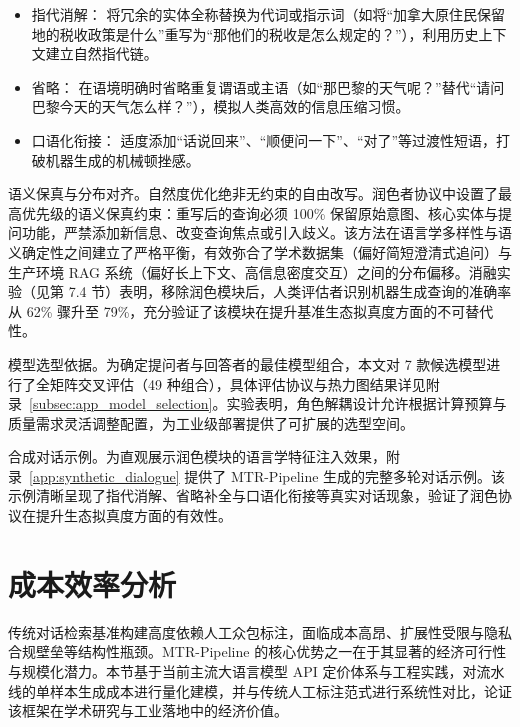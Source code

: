 \begin{itemize}

    \item 指代消解： 将冗余的实体全称替换为代词或指示词（如将“加拿大原住民保留地的税收政策是什么”重写为“那他们的税收是怎么规定的？”），利用历史上下文建立自然指代链。

    \item 省略： 在语境明确时省略重复谓语或主语（如“那巴黎的天气呢？”替代“请问巴黎今天的天气怎么样？”），模拟人类高效的信息压缩习惯。

    \item 口语化衔接： 适度添加“话说回来”、“顺便问一下”、“对了”等过渡性短语，打破机器生成的机械顿挫感。

\end{itemize}



语义保真与分布对齐。自然度优化绝非无约束的自由改写。润色者协议中设置了最高优先级的语义保真约束：重写后的查询必须 100\% 保留原始意图、核心实体与提问功能，严禁添加新信息、改变查询焦点或引入歧义。该方法在语言学多样性与语义确定性之间建立了严格平衡，有效弥合了学术数据集（偏好简短澄清式追问）与生产环境 RAG 系统（偏好长上下文、高信息密度交互）之间的分布偏移。消融实验（见第 7.4 节）表明，移除润色模块后，人类评估者识别机器生成查询的准确率从 62\% 骤升至 79\%，充分验证了该模块在提升基准生态拟真度方面的不可替代性。


模型选型依据。为确定提问者与回答者的最佳模型组合，本文对 7 款候选模型进行了全矩阵交叉评估（49 种组合），具体评估协议与热力图结果详见附录~\ref{subsec:app_model_selection}。实验表明，角色解耦设计允许根据计算预算与质量需求灵活调整配置，为工业级部署提供了可扩展的选型空间。

合成对话示例。为直观展示润色模块的语言学特征注入效果，附录~\ref{app:synthetic_dialogue} 提供了 MTR-Pipeline 生成的完整多轮对话示例。该示例清晰呈现了指代消解、省略补全与口语化衔接等真实对话现象，验证了润色协议在提升生态拟真度方面的有效性。
\section{成本效率分析}

\label{sec:cost_efficiency}



传统对话检索基准构建高度依赖人工众包标注，面临成本高昂、扩展性受限与隐私合规壁垒等结构性瓶颈。MTR-Pipeline 的核心优势之一在于其显著的经济可行性与规模化潜力。本节基于当前主流大语言模型 API 定价体系与工程实践，对流水线的单样本生成成本进行量化建模，并与传统人工标注范式进行系统性对比，论证该框架在学术研究与工业落地中的经济价值。



